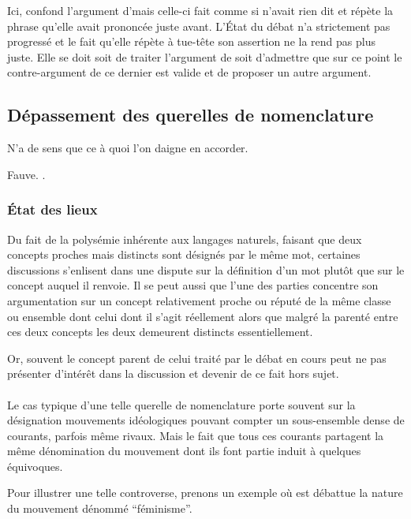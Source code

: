 Ici, \B confond l’argument d’\A mais celle-ci fait comme si \B n’avait rien dit et répète la phrase qu’elle avait prononcée juste avant. L’État du débat n’a strictement pas progressé et le fait qu’elle répète à tue-tête son assertion ne la rend pas plus juste. Elle se doit soit de traiter l’argument de \B soit d’admettre que sur ce point le contre-argument de ce dernier est valide et de proposer un autre argument.

\subsection{Dépassement des querelles de nomenclature}
\epigraph{N’a de sens que ce à quoi l’on daigne en accorder.}{Fauve. .}
\subsubsection{État des lieux}
Du fait de la polysémie inhérente aux langages naturels, faisant que deux concepts proches mais distincts sont désignés par le même mot, certaines discussions s’enlisent dans une dispute sur la définition d’un mot plutôt que sur le concept auquel il renvoie. Il se peut aussi que l’une des parties concentre son argumentation sur un concept relativement proche ou réputé de la même classe ou ensemble dont celui dont il s’agit réellement alors que malgré la parenté entre ces deux concepts les deux demeurent distincts essentiellement.

Or, souvent le concept parent de celui traité par le débat en cours peut ne pas présenter d’intérêt dans la discussion et devenir de ce fait hors sujet.

\paragraph{}
Le cas typique d’une telle querelle de nomenclature porte souvent sur la désignation mouvements idéologiques pouvant compter un sous-ensemble dense de courants, parfois même rivaux. Mais le fait que tous ces courants partagent la même dénomination du mouvement dont ils font partie induit à quelques équivoques.

Pour illustrer une telle controverse, prenons un exemple où est débattue la nature du mouvement dénommé \enquote{féminisme}.



